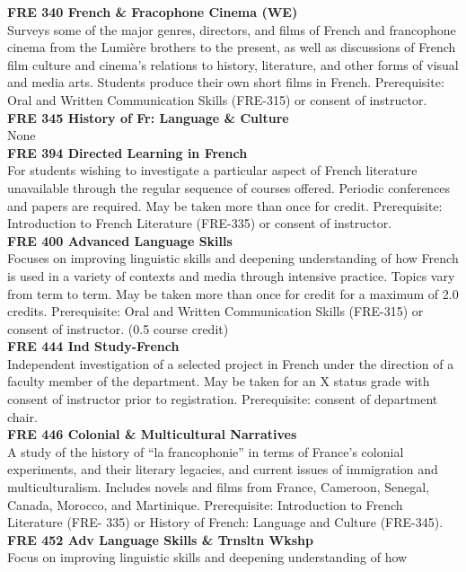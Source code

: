 \documentclass[
  letterpaper,
]{scrbook}
\begin{document}
\textbf{FRE 340 French \& Fracophone Cinema (WE)}\\
Surveys some of the major genres, directors, and films of French and
francophone cinema from the Lumière brothers to the present, as well as
discussions of French film culture and cinema's relations to history,
literature, and other forms of visual and media arts. Students produce
their own short films in French. Prerequisite: Oral and Written
Communication Skills (FRE-315) or consent of instructor.\\
\textbf{FRE 345 History of Fr: Language \& Culture}\\
None\\
\textbf{FRE 394 Directed Learning in French}\\
For students wishing to investigate a particular aspect of French
literature unavailable through the regular sequence of courses offered.
Periodic conferences and papers are required. May be taken more than
once for credit. Prerequisite: Introduction to French Literature
(FRE-335) or consent of instructor.\\
\textbf{FRE 400 Advanced Language Skills}\\
Focuses on improving linguistic skills and deepening understanding of
how French is used in a variety of contexts and media through intensive
practice. Topics vary from term to term. May be taken more than once for
credit for a maximum of 2.0 credits. Prerequisite: Oral and Written
Communication Skills (FRE-315) or consent of instructor. (0.5 course
credit)\\
\textbf{FRE 444 Ind Study-French}\\
Independent investigation of a selected project in French under the
direction of a faculty member of the department. May be taken for an X
status grade with consent of instructor prior to registration.
Prerequisite: consent of department chair.\\
\textbf{FRE 446 Colonial \& Multicultural Narratives}\\
A study of the history of ``la francophonie'' in terms of France's
colonial experiments, and their literary legacies, and current issues of
immigration and multiculturalism. Includes novels and films from France,
Cameroon, Senegal, Canada, Morocco, and Martinique. Prerequisite:
Introduction to French Literature (FRE- 335) or History of French:
Language and Culture (FRE-345).\\
\textbf{FRE 452 Adv Language Skills \& Trnsltn Wkshp}\\
Focus on improving linguistic skills and deepening understanding of how
\end{document}
